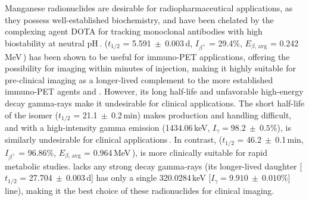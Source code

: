Manganese radionuclides are desirable for radiopharmaceutical applications, as 
they possess well-established biochemistry, and have been 
chelated 
by the complexing agent DOTA for tracking monoclonal antibodies with high biostability at neutral pH\,\cite{Graves2015}.
 ($t_{1/2}$ = 5.591$~\pm~$0.003\,d, $I_{\beta^+}$ = 29.4\%, $E_{\beta\text{, avg}}$ = 0.242\,MeV\,\cite{Dong2015}) has been shown to be useful for immuno-PET applications, 
offering the possibility for imaging within minutes of injection,
making it highly suitable for pre-clinical imaging as a longer-lived complement   to the more established immuno-PET agents  and   .  
However, its  long half-life and unfavorable high-energy decay gamma-rays 
make it undesirable for clinical applications.
The short half-life of the   isomer ($t_{1/2}$ = 21.1$~\pm~$0.2\,min)
makes production and handling difficult, and with a  high-intensity gamma emission (1434.06\,keV, $I_\gamma = 98.2~\pm~0.5\%$),  
 is similarly undesirable for clinical applications\,\cite{Dong2015}.
In contrast,  ($t_{1/2}$ = 46.2$~\pm~$0.1\,min, $I_{\beta^+}$ = 96.86\%, $E_{\beta\text{, avg}}$ = 0.964\,MeV\,\cite{PhysRevC.96.014613,Wang2017}), 
is more clinically suitable for rapid metabolic studies.
 lacks any strong decay gamma-rays (its longer-lived daughter  [$t_{1/2}$ = 27.704$~\pm~$0.003\,d] has only a single  320.0284\,keV [$I_\gamma = 9.910~\pm~0.010\%$] line), making it the best choice of these radionuclides for clinical imaging.



